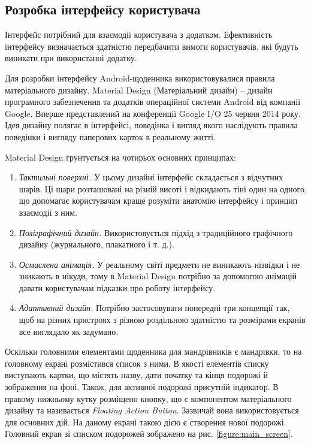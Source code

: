 \documentclass[../main.tex]{subfiles}
\begin{document}
\subsection{Розробка інтерфейсу користувача}
Інтерфейс потрібний для взаємодії користувача з додатком. Ефективність інтерфейсу визначається здатністю передбачити вимоги користувачів, які будуть виникати при використанні додатку. 

Для розробки інтерфейсу Android-щоденника використовувалися правила матеріального дизайну. Material Design (Матеріальний дизайн) -- дизайн програмного забезпечення та додатків операційної системи Android від компанії Google. Вперше представлений на конференції Google I/O 25 червня 2014 року.  Ідея дизайну полягає в інтерфейсі, поведінка і вигляд якого наслідують правила поведінки і вигляду паперових карток в реальному житті. 

Material Design грунтується на чотирьох основних принципах:

\begin{enumerate}
	\item \textit{Тактильні поверхні.} У цьому дизайні інтерфейс складається з відчутних шарів. Ці шари розташовані на різній висоті і відкидають тіні один на одного, що допомагає користувачам краще розуміти анатомію інтерфейсу і принцип взаємодії з ним.
	\item \textit{Поліграфічний дизайн.} Використовується підхід з традиційного графічного дизайну (журнального, плакатного і т. д.).
	\item \textit{Осмислена анімація.} У реальному світі предмети не виникають нізвідки і не зникають в нікуди, тому в Material Design потрібно за допомогою анімацій давати користувачам підказки про роботу інтерфейсу.
	\item \textit{Адаптивний дизайн.} Потрібно застосовувати попередні три концепції так, щоб на різних пристроях з різною роздільною здатністю та розмірами екранів все виглядало як задумано.
\end{enumerate}

Оскільки головними елементами щоденника для мандрівників є мандрівки, то на головному екрані розмістився список з ними. В якості елементів списку виступають картки, що містять назву, дати початку та кінця подорожі й зображення на фоні. Також, для активної подорожі присутній індикатор. В правому нижньому кутку розміщено кнопку, що є компонентом матеріального дизайну та називається \textit{Floating Action Button}. Зазвичай вона використовується для основних дій. На даному екрані такою дією є створення нової подорожі. Головний екран зі списком подорожей зображено на рис. \ref{figure:main_screen}.
\end{document}
